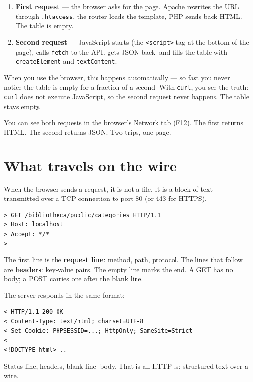 \documentclass[11pt,a4paper,oneside]{book}
\providecommand{\tightlist}{%
  \setlength{\itemsep}{0pt}\setlength{\parskip}{0pt}}
\begin{document}
\begin{enumerate}
\def\labelenumi{\arabic{enumi}.}
\tightlist
\item
  \textbf{First request} --- the browser asks for the page.
  Apache rewrites the URL through \texttt{.htaccess}, the router
  loads the template, PHP sends back HTML. The table is empty.
\item
  \textbf{Second request} --- JavaScript starts (the
  \texttt{\textless{}script\textgreater{}} tag at the bottom of
  the page), calls \texttt{fetch} to the API, gets JSON back, and
  fills the table with \texttt{createElement} and
  \texttt{textContent}.
\end{enumerate}

When you use the browser, this happens automatically --- so fast
you never notice the table is empty for a fraction of a second.
With \texttt{curl}, you see the truth: \texttt{curl} does not
execute JavaScript, so the second request never happens. The
table stays empty.

You can see both requests in the browser's Network tab (F12). The
first returns HTML. The second returns JSON. Two trips, one page.

\hypertarget{what-travels-on-the-wire}{%
\section{What travels on the
wire}\label{what-travels-on-the-wire}}

When the browser sends a request, it is not a file. It is a block
of text transmitted over a TCP connection to port 80 (or 443 for
HTTPS).

\begin{verbatim}
> GET /bibliotheca/public/categories HTTP/1.1
> Host: localhost
> Accept: */*
>
\end{verbatim}

The first line is the \textbf{request line}: method, path,
protocol. The lines that follow are \textbf{headers}: key-value
pairs. The empty line marks the end. A GET has no body; a POST
carries one after the blank line.

The server responds in the same format:

\begin{verbatim}
< HTTP/1.1 200 OK
< Content-Type: text/html; charset=UTF-8
< Set-Cookie: PHPSESSID=...; HttpOnly; SameSite=Strict
<
<!DOCTYPE html>...
\end{verbatim}

Status line, headers, blank line, body. That is all HTTP is:
structured text over a wire.
\end{document}
